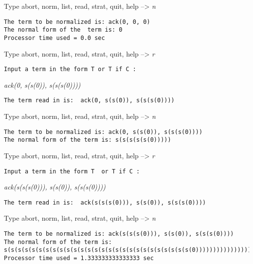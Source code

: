 Type abort, norm, list, read, strat, quit, help --> {\em n}
\begin{verbatim}
The term to be normalized is: ack(0, 0, 0)
The normal form of the  term is: 0
Processor time used = 0.0 sec
\end{verbatim}
Type abort, norm, list, read, strat, quit, help --> {\em r}
\begin{verbatim}
Input a term in the form T or T if C :
\end{verbatim}
{\em ack(0, s(s(0)), s(s(s(0))))}
\begin{verbatim}
The term read in is:  ack(0, s(s(0)), s(s(s(0))))
\end{verbatim}
Type abort, norm, list, read, strat, quit, help --> {\em n}
\begin{verbatim}
The term to be normalized is: ack(0, s(s(0)), s(s(s(0))))
The normal form of the term is: s(s(s(s(s(0)))))
\end{verbatim}
Type abort, norm, list, read, strat, quit, help --> {\em r}
\begin{verbatim}
Input a term in the form T  or T if C :
\end{verbatim}
{\em ack(s(s(s(0))), s(s(0)), s(s(s(0))))}
\begin{verbatim}
The term read in is:  ack(s(s(s(0))), s(s(0)), s(s(s(0))))
\end{verbatim}
Type abort, norm, list, read, strat, quit, help --> {\em n}
\begin{verbatim}
The term to be normalized is: ack(s(s(s(0))), s(s(0)), s(s(s(0))))
The normal form of the term is:
s(s(s(s(s(s(s(s(s(s(s(s(s(s(s(s(s(s(s(s(s(s(s(s(s(s(s(0)))))))))))))))))))))))))))
Processor time used = 1.333333333333333 sec
\end{verbatim}
\rm
\normalsize
